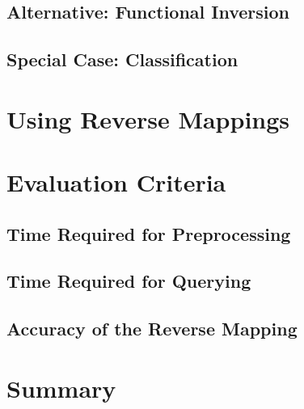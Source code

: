 \subsection{Alternative: Functional Inversion}

\subsection{Special Case: Classification}


\section{Using Reverse Mappings}





\section{Evaluation Criteria}

\subsection{Time Required for Preprocessing}

\subsection{Time Required for Querying}

\subsection{Accuracy of the Reverse Mapping}


\section{Summary}




